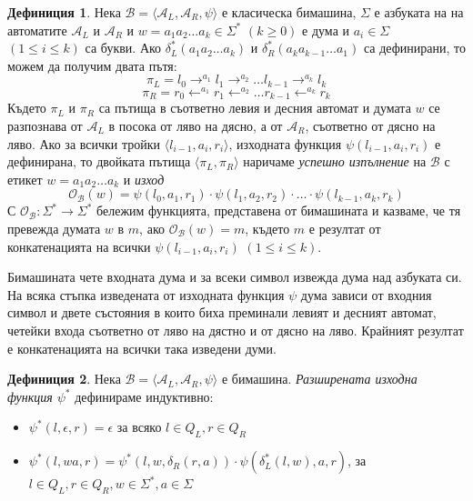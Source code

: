 \documentclass[12pt, oneside]{article}
\theoremstyle{definition}
\newtheorem{definition}{Дефиниция}[section]
\begin{document}
\begin{definition} 
	Нека \( \mathcal{B} = \langle \mathcal{A}_L, \mathcal{A}_R, \psi \rangle \) е класическа бимашина, \( \Sigma \) е азбуката на на автоматите \( \mathcal{A}_L \) и \( \mathcal{A}_R \) и \( w = a_1a_2 \dots a_k \in \Sigma^* \) \( (k \geq 0) \) е дума и \( a_i \in \Sigma \) \( (1 \leq i \leq k) \) са букви. Ако \( \delta_L^*(a_1a_2 \ldots a_k) \) и \( \delta_R^*(a_ka_{k-1} \dots a_1) \) са дефинирани, то можем да получим двата пътя:
	\[ \pi_L = l_0 \to^{a_1} l_1 \to^{a_2} \ldots l_{k-1} \to^{a_k} l_k \]
	\[ \pi_R = r_0 \leftarrow^{a_1} r_1 \leftarrow^{a_2} \ldots r_{k-1} \leftarrow^{a_k} r_k \]
	Където \( \pi_L \) и \( \pi_R \) са пътища в съответно левия и десния автомат и думата \( w \) се разпознава от \( \mathcal{A}_L \) в посока от ляво на дясно, а от \( \mathcal{A}_R \), съответно от дясно на ляво. Ако за всички тройки \( \langle l_{i-1}, a_i, r_i \rangle \), изходната функция \( \psi(l_{i-1}, a_i, r_i) \) е дефинирана, то двойката пътища \( \langle \pi_L, \pi_R \rangle \) наричаме \emph{успешно изпълнение} на \( \mathcal{B} \) с етикет \( w = a_1a_2 \dots a_k \) и \emph{изход}
	\[ \mathcal{O_B}(w) = \psi(l_0, a_1, r_1) \cdot \psi(l_1, a_2, r_2) \cdot \dots \cdot \psi(l_{k-1}, a_k, r_k) \]
	С \( \mathcal{O_B}: \Sigma^* \to \Sigma^* \) бележим функцията, представена от бимашината и казваме, че тя превежда думата \(w\) в \(m\), ако \( \mathcal{O_B}(w) = m \), където \(m\) е резултат от конкатенацията на всички \( \psi(l_{i-1}, a_i, r_i) \) \( (1 \leq i \leq k) \).
\end{definition}

\noindent Бимашината чете входната дума и за всеки символ извежда дума над азбуката си. На всяка стъпка изведената от изходната функция \( \psi \) дума зависи от входния символ и двете състояния в които биха преминали левият и десният автомат, четейки входа съответно от ляво на дястно и от дясно на ляво. Крайният резултат е конкатенацията на всички така изведени думи.

\begin{definition}
	Нека \( \mathcal{B} = \langle \mathcal{A}_L, \mathcal{A}_R, \psi \rangle \) е бимашина. \emph{Разширената изходна функция \( \psi^* \)} дефинираме индуктивно:

	\begin{itemize}
		\item \( \psi^*(l, \epsilon, r) = \epsilon \) за всяко \( l \in Q_L, r \in Q_R \)
		\item \( \psi^*(l, wa, r) = \psi^*(l, w, \delta_R(r, a)) \cdot \psi(\delta^*_L(l, w), a, r) \), за \( l \in Q_L, r \in Q_R, w \in \Sigma^*, a \in \Sigma \)
	\end{itemize}
\end{definition}
\end{document}
